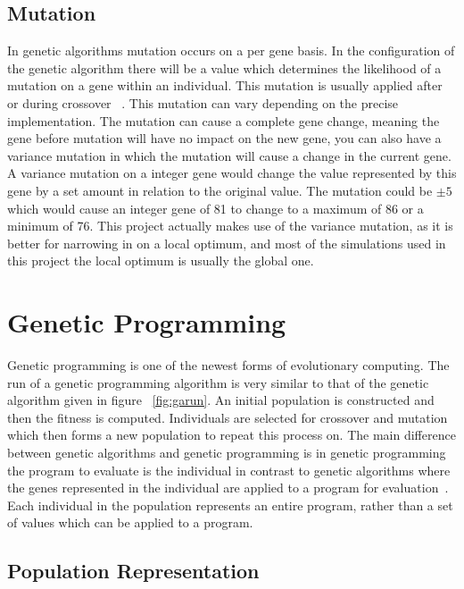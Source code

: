 \documentclass[12pt]{article}
\begin{document}
\subsection{Mutation}
In genetic algorithms mutation occurs on a per gene basis. In the configuration of the genetic algorithm there will be a value which 
determines the likelihood of a mutation on a gene within an individual. This mutation is usually applied after or during crossover ~\cite{goldberg1989genetic}.
This mutation can vary depending on the precise implementation. The mutation can cause a complete gene change, meaning the gene before mutation will
have no impact on the new gene, you can also have a variance mutation in which the mutation will cause a change in the current gene. A variance
mutation on a integer gene would change the value represented by this gene by a set amount in relation to the original value. The mutation could be \(\pm5\)
which would cause an integer gene of 81 to change to a maximum of 86 or a minimum of 76. This project actually makes use of the variance mutation, as it is 
better for narrowing in on a local optimum, and most of the simulations used in this project the local optimum is usually the global one.

\section{Genetic Programming}
Genetic programming is one of the newest forms of evolutionary computing. 
The run of a genetic programming algorithm is very similar to that of the genetic algorithm given in figure ~\ref{fig:garun}. An initial
population is constructed and then the fitness is computed. Individuals are selected for crossover and mutation which then forms a new 
population to repeat this process on. The main difference between genetic algorithms and genetic programming is in genetic programming
the program to evaluate is the individual in contrast to genetic algorithms where the genes represented in the individual are applied to
a program for evaluation~\cite{whitley94,gpintro98}. Each individual in the population represents an entire program, rather than a set of values which can be
applied to a program. 

\subsection{Population Representation}
\end{document}
